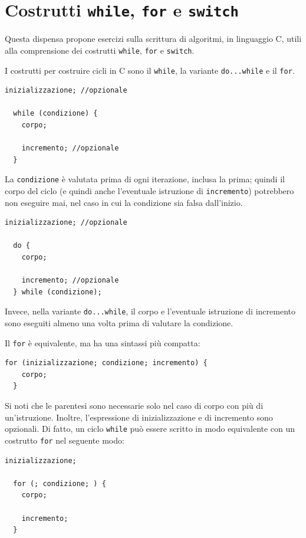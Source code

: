 \documentclass[oneside]{scrbook}
\begin{document}
\chapter{Costrutti \texttt{while}, \texttt{for} e \texttt{switch}}

Questa dispensa propone esercizi sulla scrittura di algoritmi, in linguaggio C, utili alla comprensione dei costrutti \texttt{while}, \texttt{for} e \texttt{switch}.

I costrutti per costruire cicli in C sono il \texttt{while}, la variante \texttt{do...while} e il \texttt{for}.

\begin{lstlisting}[style=cstyle]
  inizializzazione; //opzionale

  while (condizione) {
    corpo;

    incremento; //opzionale
  }
\end{lstlisting}

La \texttt{condizione} \`e valutata prima di ogni iterazione, inclusa la prima; quindi il corpo del ciclo (e quindi anche l'eventuale istruzione di \texttt{incremento}) potrebbero non eseguire mai, nel caso in cui la condizione sia falsa dall'inizio.

\begin{lstlisting}[style=cstyle]
  inizializzazione; //opzionale

  do {
    corpo;

    incremento; //opzionale
  } while (condizione);
\end{lstlisting}

Invece, nella variante \texttt{do...while}, il corpo e l'eventuale istruzione di incremento sono eseguiti almeno una volta prima di valutare la condizione.

Il \texttt{for} è equivalente, ma ha una sintassi più compatta:

\begin{lstlisting}[style=cstyle]
  for (inizializzazione; condizione; incremento) {
    corpo;
  }
\end{lstlisting}

Si noti che le parentesi sono necessarie solo nel caso di corpo con più di un'istruzione. Inoltre, l'espressione di inizializzazione e di incremento sono opzionali. Di fatto, un ciclo \texttt{while} può essere scritto in modo equivalente con un costrutto \texttt{for} nel seguente modo:
\newpage
\begin{lstlisting}[style=cstyle]
  inizializzazione;

  for (; condizione; ) {
    corpo;

    incremento;
  }
\end{lstlisting}
\end{document}
